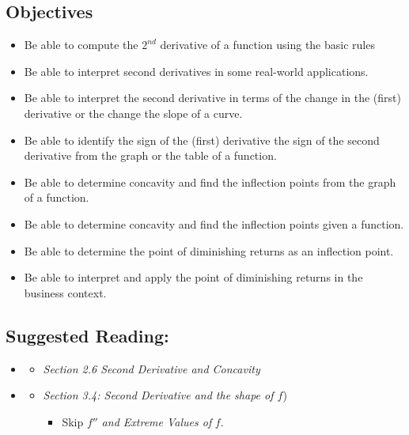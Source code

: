 \vspace{-0.25 in}
\begin{framed}
\subsection*{Objectives}
\begin{itemize}
    \item Be able to compute the $2^{nd}$ derivative of a function using the basic rules
    \item Be able to interpret second derivatives in some real-world applications.
    \item Be able to interpret the second derivative in terms of the change in the (first) derivative or the change the slope of a curve.
    \item Be able to identify the sign of the (first) derivative the sign of the second derivative from the graph or the table of a function.
    \item Be able to determine concavity and find the inflection points from the graph of a function.
    \item Be able to determine concavity and find the inflection points given a function.
    \item Be able to determine the point of diminishing returns as an inflection point.
    \item Be able to interpret and apply the point of diminishing returns in the business context.
\end{itemize}

\subsection*{Suggested Reading:}
\begin{itemize}
\item \cite{Calaway}\footnotemark[1]
   \begin{itemize}
        \item \emph{Section 2.6 Second Derivative and Concavity}
    \end{itemize}

\item \cite{Hoffman}\footnotemark[2]
    \begin{itemize}
        \item \emph{Section 3.4: Second Derivative and the shape of $f$})
        \begin{itemize}
            \item Skip $f''$ \emph{and Extreme Values of} $f$.
        \end{itemize}
        

\end{itemize}
\end{itemize}
\end{framed}
